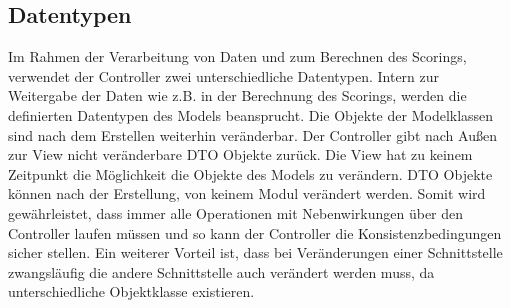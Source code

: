 \subsection{Datentypen}
Im Rahmen der Verarbeitung von Daten und zum Berechnen des Scorings, verwendet der Controller zwei unterschiedliche Datentypen.
Intern zur Weitergabe der Daten wie z.B. in der Berechnung des Scorings, werden die definierten Datentypen des Models beansprucht.
Die Objekte der Modelklassen sind nach dem Erstellen weiterhin veränderbar.
Der Controller gibt nach Außen zur View nicht veränderbare DTO Objekte zurück.
Die View hat zu keinem Zeitpunkt die Möglichkeit die Objekte des Models zu verändern.
DTO Objekte können nach der Erstellung, von keinem Modul verändert werden.
Somit wird gewährleistet,
dass immer alle Operationen mit Nebenwirkungen über den Controller laufen müssen und so kann der Controller
die Konsistenzbedingungen sicher stellen.
Ein weiterer Vorteil ist,
dass bei Veränderungen einer Schnittstelle
zwangsläufig die andere Schnittstelle auch verändert werden muss,
da unterschiedliche Objektklasse existieren.

